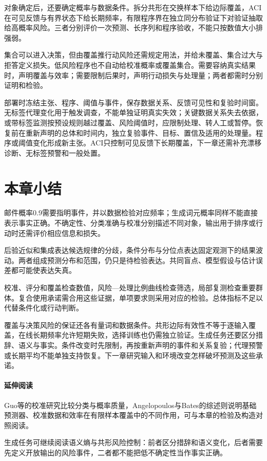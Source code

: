 对象确定后，还要确定概率与数据条件。拆分共形在交换样本下给边际覆盖，ACI在可见反馈与有界状态下给长期频率，有限程序界在独立同分布验证下对验证抽取给高概率风险。三者分别评价一次预测、长序列和程序验收，不能只按数值大小排强弱。

集合可以进入决策，但由覆盖推行动风险还需规定用法，并给未覆盖、集合过大与拒答定义损失。低风险程序也不自动给校准概率或覆盖集合。需要容纳真实结果时，声明覆盖与效率；需要限制后果时，声明行动损失与处理量；两者都需时分别证明和检验。

部署时冻结主张、程序、阈值与事件，保存数据关系、反馈可见性和复验时间窗。无标签代理变化用于触发调查，不能单独证明真实失效；关键数据关系失去依据，或带标签监测按预设规则越过覆盖、风险阈值时，应限制处理、转人工或暂停。恢复前在重新声明的总体和时间内，独立复验事件、目标、置信及适用的处理量。程序或阈值变化形成新主张。ACI只控制可见反馈下长期覆盖，下一章还需补充漂移诊断、无标签预警和一般处置。

\section{本章小结}
\label{sec:reliability-summary}

邮件概率0.9需要指明事件，并以数据检验对应频率；生成词元概率同样不能直接表示事实正确。不确定性、分类准确与校准分别描述不同对象，输出用于排序或行动时还需评价相应信息和损失。

后验近似和集成表达候选规律的分歧，条件分布与分位点表达固定观测下的结果波动。两者组成预测分布和范围，仍只是待检验表达。共同盲点、模型假设与估计误差都可能使表达失真。

校准、评分和覆盖检查数值，风险—处理比例曲线检查筛选，局部复测检查重要群体。复合使用承诺需合用这些证据，单项要求则采用对应的检验。总体指标不足以代替条件化或行动判断。

覆盖与决策风险的保证还各有量词和数据条件。共形边际有效性不等于逐输入覆盖，在线长期频率允许短期失败，选择训练也仍需独立验证。生成任务还要区分措辞、语义与事实。条件改变时先限制，再按重新声明的事件和关系复验；代理预警或长期平均不能单独支持恢复。下一章研究输入和环境改变怎样破坏预测及这些承诺。

\paragraph{延伸阅读}

Guo等的校准研究比较分类与概率质量，Angelopoulos与Bates的综述则说明基础预测器、校准数据和效率在有限样本覆盖中的不同作用，可与本章的检验及构造对照阅读。

生成任务可继续阅读语义熵与共形风险控制：前者区分措辞和语义变化，后者需要先定义开放输出的风险事件，二者都不能把低不确定性当作事实正确。

